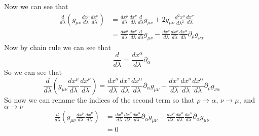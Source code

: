 \documentclass[11pt]{article}
\numberwithin{equation}{section}
\begin{document}
\begin{enumerate}[(a)]
Now we can see that 
\begin{align*}
\frac{d}{d\lambda}\left(g_{\mu\nu}\frac{dx^{\mu}}{d\lambda}\frac{dx^{\nu}}{d\lambda}\right) &= \frac{dx^{\mu}}{d\lambda}\frac{dx^{\nu}}{d\lambda}\frac{d}{d\lambda}g_{\mu\nu} + 2g_{\mu\nu}\frac{d^2x^{\mu}}{d\lambda^2}\frac{dx^{\nu}}{d\lambda} \\
&= \frac{dx^{\mu}}{d\lambda}\frac{dx^{\nu}}{d\lambda}\frac{d}{d\lambda}g_{\mu\nu} - \frac{dx^{\nu}}{d\lambda}\frac{dx^{\rho}}{d\lambda}\frac{dx^{\alpha}}{d\lambda}\partial_{\rho}g_{\nu\alpha} 
\end{align*}
Now by chain rule we can see that
$$\frac{d}{d\lambda} = \frac{dx^{\alpha}}{d\lambda}\partial_{\alpha}$$
So we can see that
$$\frac{d}{d\lambda}\left(g_{\mu\nu}\frac{dx^{\mu}}{d\lambda}\frac{dx^{\nu}}{d\lambda}\right) = \frac{dx^{\mu}}{d\lambda}\frac{dx^{\nu}}{d\lambda}\frac{dx^{\alpha}}{d\lambda}\partial_{\alpha}g_{\mu\nu} - \frac{dx^{\nu}}{d\lambda}\frac{dx^{\rho}}{d\lambda}\frac{dx^{\alpha}}{d\lambda}\partial_{\rho}g_{\nu\alpha}$$
So now we can rename the indices of the second term so that $\rho\rightarrow\alpha$, $\nu\rightarrow\mu$, and $\alpha\rightarrow\nu$
\begin{align*}
\frac{d}{d\lambda}\left(g_{\mu\nu}\frac{dx^{\mu}}{d\lambda}\frac{dx^{\nu}}{d\lambda}\right)  &= \frac{dx^{\mu}}{d\lambda}\frac{dx^{\nu}}{d\lambda}\frac{dx^{\alpha}}{d\lambda}\partial_{\alpha}g_{\mu\nu} - \frac{dx^{\mu}}{d\lambda}\frac{dx^{\alpha}}{d\lambda}\frac{dx^{\nu}}{d\lambda}\partial_{\alpha}g_{\mu\nu} \\
&=0
\end{align*}
\end{enumerate}
\end{document}
